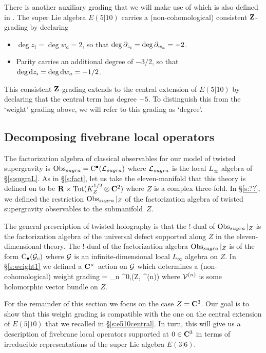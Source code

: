 \documentclass[11pt]{amsart}
\begin{document}
\parsec[s:e510grading]

There is another auxiliary grading that we will make use of which is also defined in \cite{KR,KacClass}. 
The super Lie algebra $E(5|10)$ carries a (non-cohomological) consistent $\mathbf{Z}$-grading by declaring 
\begin{itemize}
\item $\deg z_i = \deg w_a = 2$, so that $\deg \partial_{z_i} = \deg \partial_{w_a} = -2$. 
\item Parity carries an additional degree of $-3/2$, so that $\deg {\rm d} z_i = \deg {\rm d} w_a = -1/2$.
\end{itemize}
This consistent $\mathbf{Z}$-grading extends to the central extension of $E(5|10)$ by declaring that the central term has degree $-5$. 
To distinguish this from the `weight' grading above, we will refer to this grading as `degree'.

\subsection{Decomposing fivebrane local operators}

The factorization algebra of classical observables for our model of twisted supergravity is $\operatorname{Obs}_{sugra} = {\rm C}^\bullet(\mathcal L_{sugra})$ where $\mathcal L_{sugra}$ is the local $L_\infty$ algebra of \S\ref{s:sugraL}. 
As in \S\ref{s:fact}, let us take the eleven-manifold that this theory is defined on to be $\mathbf{R} \times {\rm Tot}(K^{1/2}_Z \otimes \mathbf{C}^2)$ where $Z$ is a complex three-fold.
In \S\ref{s:??}, we defined the restriction $\operatorname{Obs}_{sugra}|_{Z}$ of the factorization algebra of twisted supergravity observables to the submanifold~$Z$.

The general prescription of twisted holography is that the $!$-dual of $\operatorname{Obs}_{sugra}|_Z$ is the factorization algebra of the universal defect supported along $Z$ in the eleven-dimensional theory.
The $!$-dual of the factorization algebra $\operatorname{Obs}_{sugra}|_Z$ is of the form ${\rm C}_\bullet (\mathcal G_c)$ where $\mathcal G$ is an infinite-dimensional local $L_\infty$ algebra on $Z$.
In \S \ref{s:weight1} we defined a $\mathbf{C}^\times$ action on $\mathcal G$ which determines a (non-cohomological) weight grading
\beqn\label{eqn:decomp2a}
\cG = \bigoplus_{n } \Omega^{0,\bu}(Z, \cV^{(n)}) 
\eeqn
where $\mathcal V^{(n)}$ is some holomorphic vector bundle on $Z$.

For the remainder of this section we focus on the case $Z = \mathbf{C}^3$. 
Our goal is to show that this weight grading is compatible with the one on the central extension of $E(5|10)$ that we recalled in \S \ref{s:e510central}. 
In turn, this will give us a description of fivebrane local operators supported at $0 \in \mathbf{C}^3$ in terms of irreducible representations of the super Lie algebra $E(3|6)$. 
\end{document}
